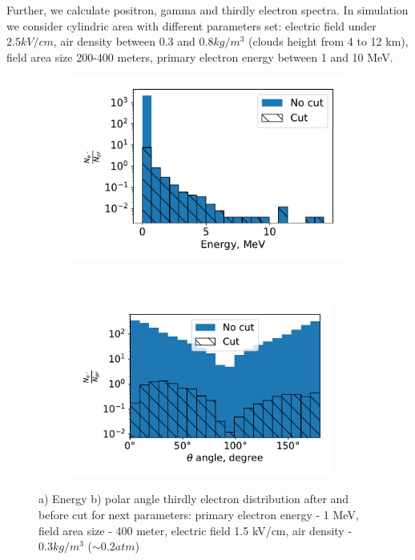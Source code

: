 \documentclass{webofc}
\begin{document}
    Further, we calculate positron, gamma and thirdly electron spectra. In simulation we consider cylindric area with different parameters set: electric field under $2.5 kV/cm$, air density between $0.3$ and $0.8 kg/m^3$ (clouds height from 4 to 12 km), field area size  200-400 meters, primary electron energy between 1 and 10 MeV.
    
    \begin{figure}[ht!]
        \begin{subfigure}[b]{0.5\textwidth}
            \includegraphics[width=0.95\linewidth]{pictures/06_energy_cut_electron}
            \caption{}
            \label{pic-electron-cut-a}
        \end{subfigure}
        ~
        \begin{subfigure}[b]{0.5\textwidth}
            \includegraphics[width=0.95\textwidth]{pictures/07_theta_cut_electron}
            \caption{}
            \label{pic-electron-cut-b}
        \end{subfigure}
        \caption{ a) Energy b) polar angle thirdly electron distribution after and before cut for next parameters: primary electron energy - 1 MeV, field area size - 400 meter, electric field 1.5 kV/cm, air density - $0.3 kg/m^3$ ($\sim 0.2 atm$)}
    \end{figure}
    
\end{document}
